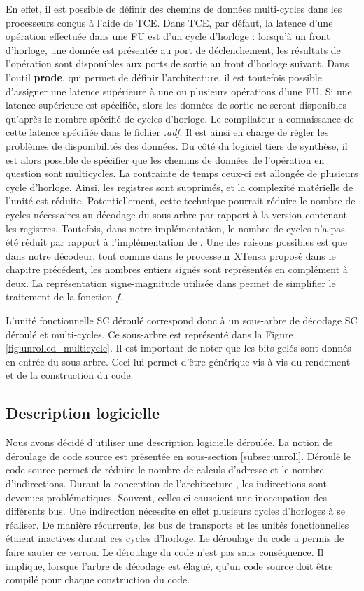 En effet, il est possible de définir des chemins de données multi-cycles dans les processeurs conçus à l'aide de TCE. Dans TCE, par défaut, la latence d'une opération effectuée dans une FU est d'un cycle d'horloge : lorsqu'à un front d'horloge, une donnée est présentée au port de déclenchement, les résultats de l'opération sont disponibles aux ports de sortie au front d'horloge suivant. Dans l'outil \textbf{prode}, qui permet de définir l'architecture, il est toutefois possible d'assigner une latence supérieure à une ou plusieurs opérations d'une FU. Si une latence supérieure est spécifiée, alors les données de sortie ne seront disponibles qu'après le nombre spécifié de cycles d'horloge. Le compilateur a connaissance de cette latence spécifiée dans le fichier \textit{.adf}. Il est ainsi en charge de régler les problèmes de disponibilités des données. Du côté du logiciel tiers de synthèse, il est alors possible de spécifier que les chemins de données de l'opération en question sont multicycles. La contrainte de temps ceux-ci est allongée de plusieurs cycle d'horloge. Ainsi, les registres sont supprimés, et la complexité matérielle de l'unité est réduite. Potentiellement, cette technique pourrait réduire le nombre de cycles nécessaires au décodage du sous-arbre par rapport à la version contenant les registres. Toutefois, dans notre implémentation, le nombre de cycles n'a pas été réduit par rapport à l'implémentation de \cite{gal_scalable_2016}. Une des raisons possibles est que dans notre décodeur, tout comme dans le processeur XTensa proposé dans le chapitre précédent, les nombres entiers signés sont représentés en complément à deux. La représentation signe-magnitude utilisée dans \cite{gal_scalable_2016} permet de simplifier le traitement de la fonction $f$.

L'unité fonctionnelle \og SC déroulé \fg correspond donc à un sous-arbre de décodage SC déroulé et multi-cycles. Ce sous-arbre est représenté dans la Figure \ref{fig:unrolled_multicycle}. Il est important de noter que les bits gelés sont donnés en entrée du sous-arbre. Ceci lui permet d'être générique vis-à-vis du rendement et de la construction du code.

\subsection{Description logicielle}

Nous avons décidé d'utiliser une description logicielle déroulée. La notion de déroulage de code source est présentée en sous-section \ref{subsec:unroll}. Déroulé le code source permet de réduire le nombre de calculs d'adresse et le nombre d'indirections. Durant la conception de l'architecture \TTSC, les indirections sont devenues problématiques. Souvent, celles-ci causaient une inoccupation des différents bus. Une indirection nécessite en effet plusieurs cycles d'horloges à se réaliser. De manière récurrente, les bus de transports et les unités fonctionnelles étaient inactives durant ces cycles d'horloge. Le déroulage du code a permis de faire sauter ce verrou. Le déroulage du code n'est pas sans conséquence. Il implique, lorsque l'arbre de décodage est élagué, qu'un code source doit être compilé pour chaque construction du code.

